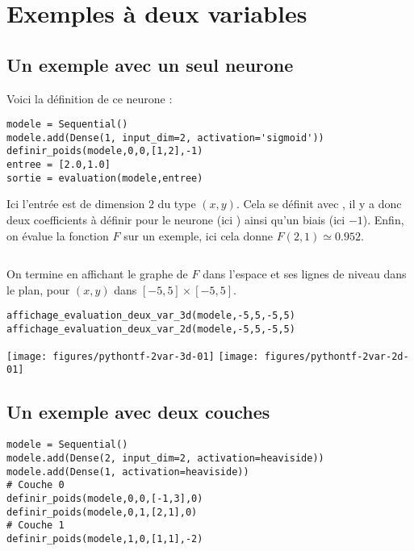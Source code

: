 \documentclass[11pt,class=report,crop=false]{standalone}
\begin{document}
\section{Exemples à deux variables}

\subsection{Un exemple avec un seul neurone}



Voici la définition de ce neurone :
\begin{lstlisting}
modele = Sequential()
modele.add(Dense(1, input_dim=2, activation='sigmoid'))
definir_poids(modele,0,0,[1,2],-1)
entree = [2.0,1.0]
sortie = evaluation(modele,entree)
\end{lstlisting}
Ici l'entrée est de dimension $2$ du type $(x,y)$. Cela se définit avec , il y a donc deux coefficients à définir pour le neurone (ici \ci{[1,2]}) ainsi qu'un biais (ici $-1$).  Enfin, on évalue la fonction $F$ sur un exemple, ici cela donne $F(2,1) \simeq 0.952$.
\begin{lstlisting}
\end{lstlisting}

On termine en affichant le graphe de $F$ dans l'espace et ses lignes de niveau dans le plan, pour $(x,y)$ dans $[-5,5]\times [-5,5]$.
\begin{lstlisting}
affichage_evaluation_deux_var_3d(modele,-5,5,-5,5)
affichage_evaluation_deux_var_2d(modele,-5,5,-5,5)
\end{lstlisting}

\begin{center}
\texttt{[image: figures/pythontf-2var-3d-01]}
\texttt{[image: figures/pythontf-2var-2d-01]}
\end{center}


\subsection{Un exemple avec deux couches}


\begin{lstlisting}
modele = Sequential()
modele.add(Dense(2, input_dim=2, activation=heaviside))
modele.add(Dense(1, activation=heaviside))
# Couche 0
definir_poids(modele,0,0,[-1,3],0)
definir_poids(modele,0,1,[2,1],0)
# Couche 1
definir_poids(modele,1,0,[1,1],-2) 
\end{lstlisting}
\end{document}
